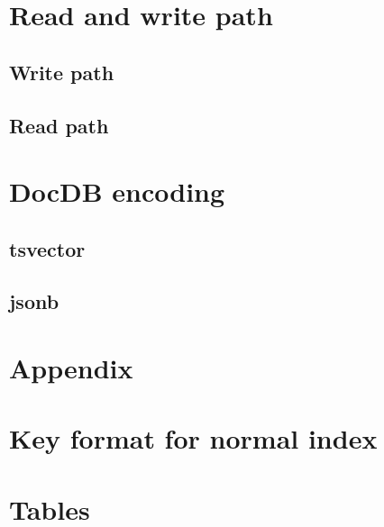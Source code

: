 \documentclass[11pt]{article}
\begin{document}
\newpage
\hypertarget{read-and-write-path}{%
\section{Read and write path}\label{read-and-write-path}}

\hypertarget{write-path}{%
\subsection{Write path}\label{write-path}}


\hypertarget{read-path}{%
\subsection{Read path}\label{read-path}}


\newpage
\hypertarget{docdb-encoding}{%
\section{DocDB encoding}\label{docdb-encoding}}


\hypertarget{tsvector}{%
\subsection{tsvector}\label{tsvector}}


\hypertarget{jsonb}{%
\subsection{jsonb}\label{jsonb}}


\newpage
\appendix
{}
\hypertarget{appendix}{%
\section*{Appendix}\label{appendix}}

\hypertarget{key-format-for-normal-index}{%
\section{Key format for normal index}\label{key-format-for-normal-index}}


\newpage
\hypertarget{tables}{%
\section{Tables}\label{tables}}
\end{document}
